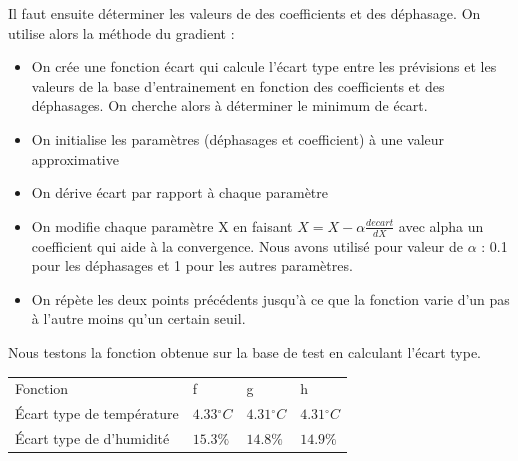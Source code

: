 \documentclass[11pt,a4paper]{article}
\begin{document}
Il faut ensuite déterminer les valeurs de des coefficients et des déphasage. On utilise alors la méthode du gradient :
\begin{itemize}
\item On crée une fonction écart qui calcule l'écart type entre les prévisions et les valeurs de la base d'entrainement en fonction des coefficients et des déphasages. On cherche alors à déterminer le minimum de écart.
\item On initialise les paramètres (déphasages et coefficient) à une valeur approximative
\item On dérive écart par rapport à chaque paramètre
\item On modifie chaque paramètre X en faisant $ X = X - \alpha  \frac{d ecart}{dX} $ avec alpha un coefficient qui aide à la convergence. Nous avons utilisé pour valeur de $\alpha$ : 0.1 pour les déphasages et 1 pour les autres paramètres.
\item On répète les deux points précédents jusqu'à ce que la fonction varie d'un pas à l'autre moins qu'un certain seuil.
\end{itemize}

Nous testons la fonction obtenue sur la base de test en calculant l'écart type.

\begin{tabular}{llll}\hline
\hline
Fonction                             &f                         &g                       &h \\
Écart type de température & $4.33{}^{\circ}C$   & $4.31{}^{\circ}C$   &  $4.31{}^{\circ}C$ \\ 
Écart type de d'humidité    & $15.3\%$   & $14.8\%$   &  $14.9\%$   \\   
\hline 
\end{tabular}
\end{document}
